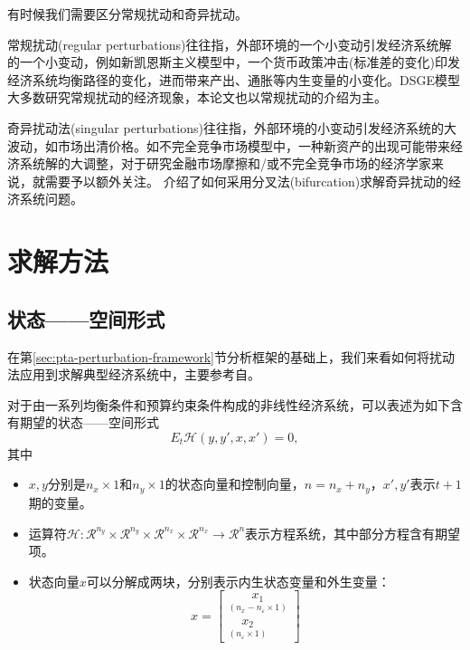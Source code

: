 \begin{remark}[常规扰动和奇异扰动]
  有时候我们需要区分常规扰动和奇异扰动。

  常规扰动(regular perturbations)往往指，外部环境的一个小变动引发经济系统解的一个小变动，例如新凯恩斯主义模型中，一个货币政策冲击(标准差的变化)印发经济系统均衡路径的变化，进而带来产出、通胀等内生变量的小变化\citep{Gali:2005gp,Woodford:2011ks}。DSGE模型大多数研究常规扰动的经济现象，本论文也以常规扰动的介绍为主。

  奇异扰动法(singular perturbations)往往指，外部环境的小变动引发经济系统的大波动，如市场出清价格。如不完全竞争市场模型中，一种新资产的出现可能带来经济系统解的大调整，对于研究金融市场摩擦和/或不完全竞争市场的经济学家来说，就需要予以额外关注\citep{Judd:1993dh}。\cite{Judd:1998uy} 介绍了如何采用分叉法(bifurcation)求解奇异扰动的经济系统问题。
\end{remark}

\section{求解方法}
\label{sec:pta-perturabation-method}

\subsection{状态——空间形式}
\label{sec:pta-perturabation-method-ssr}
在第\ref{sec:pta-perturbation-framework}节分析框架的基础上，我们来看如何将扰动法应用到求解典型经济系统中，主要参考自\cite{SchmittGroh:2004da}。

对于由一系列均衡条件和预算约束条件构成的非线性经济系统，可以表述为如下含有期望的状态——空间形式 \begin{equation}
\label{eq:pta-non-lin-sys-ssr}
E_t \mathcal{H} (y, y', x, x') = 0,
\end{equation}
其中
\begin{itemize}
  \item $x,y$分别是$n_x \times 1$和$n_y \times
1$的状态向量和控制向量，$n=n_x + n_y$，$x',y'$表示$t+1$期的变量。
  \item 运算符$\mathcal{H}:
\mathcal{R}^{n_y} \times \mathcal{R}^{n_y} \times \mathcal{R}^{n_x} \times
\mathcal{R}^{n_x} \rightarrow \mathcal{R}^{n}$表示方程系统，其中部分方程含有期望项。
  \item 状态向量$x$可以分解成两块，分别表示内生状态变量和外生变量：
\begin{equation*} x = \begin{bmatrix}
\underset{\left(n_x - n_{\varepsilon} \times 1\right)}{x_1} \\
\underset{(n_{\varepsilon} \times 1)}{x_2} \end{bmatrix} \end{equation*}
\end{itemize}

